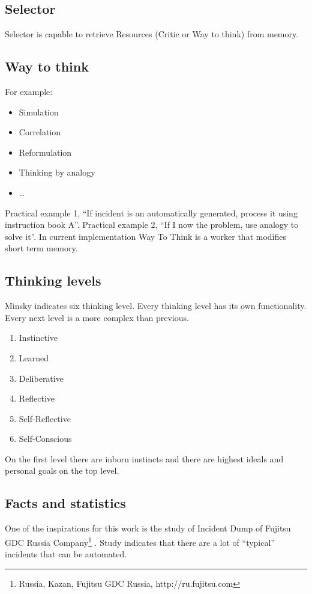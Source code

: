 \documentclass{llncs}
\begin{document}
\subsection{Selector}
Selector is capable to retrieve Resources (Critic or Way to think) from memory.

\subsection{Way to think}

For example:
\begin{itemize}
 \item Simulation
 \item Correlation
 \item Reformulation
 \item Thinking by analogy
 \item …
\end{itemize}

Practical example 1, “If incident is an automatically generated, process it using instruction book A”.
Practical example 2, “If I now the problem, use analogy to solve it”. In current implementation Way To Think is a worker that modifies short term memory.

\subsection{Thinking levels}

Minsky indicates six thinking level. Every thinking level has its own functionality. Every next level is a more complex than previous.

\begin{enumerate}
 \item Instinctive
 \item Learned
 \item Deliberative
 \item Reflective
 \item Self-Reflective
 \item Self-Conscious
\end{enumerate}
On the first level there are inborn instincts and there are highest ideals and personal goals on the top level.

\subsection{Facts and statistics}
One of the inspirations for this work is the study of Incident Dump of Fujitsu GDC Russia Company\footnote{Russia, Kazan, Fujitsu GDC Russia, http://ru.fujitsu.com} . Study indicates that there are a lot of “typical” incidents that can be automated.
\end{document}
